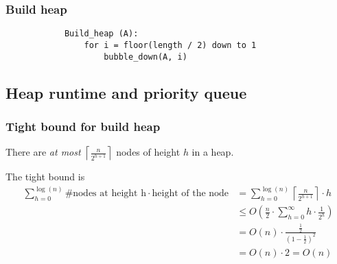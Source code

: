     \subsubsection{Build heap}
    \begin{definition}
        \begin{lstlisting}
            Build_heap (A):
                for i = floor(length / 2) down to 1
                    bubble_down(A, i)
        \end{lstlisting}

    \end{definition}

\subsection{Heap runtime and priority queue}
    \subsubsection{Tight bound for build heap}
    \begin{definition}
        There are \emph{at most} \( \left\lceil \frac{n}{2^{h+1}} \right\rceil \) nodes of height \( h \) in a heap.
        \vspace{1em}

        The tight bound is
        \begin{align*}
            \sum_{h=0}^{\log(n)} \text{\# nodes at height h} \cdot \text{height of the node} &= \sum_{h=0}^{\log(n)} \left\lceil \frac{n}{2^{h+1}} \right\rceil \cdot h \\
            &\leq O\left(\frac{n}{2} \cdot \sum_{h=0}^{\infty} h \cdot \frac{1}{2^h}\right) \\ 
            &= O(n) \cdot \frac{\frac{1}{2}}{(1 - \frac{1}{2})^2} \\
            &= O(n) \cdot 2 = O(n)
        \end{align*}
    \end{definition}

